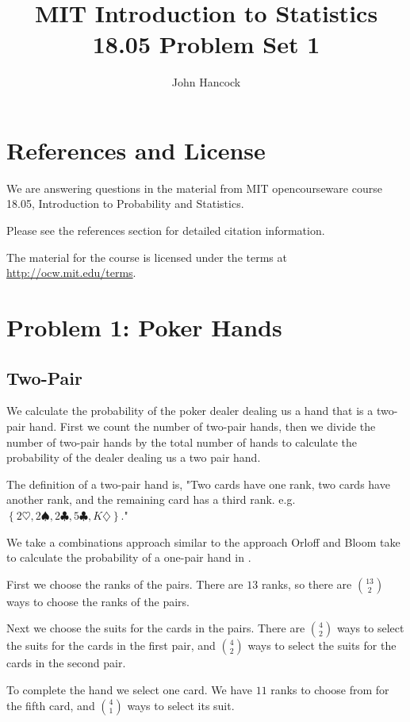 \documentclass[a4paper,11pt]{article}
\author{John Hancock}
\title{MIT Introduction to Statistics 18.05 Problem Set 1}
\begin{document}
\maketitle
\tableofcontents
\section{References and License}
We are answering questions in the material from MIT opencourseware
course 18.05, Introduction to Probability and Statistics.

Please see the references section for detailed citation information.

The material for the course is licensed under the terms at 
\url{http://ocw.mit.edu/terms}.

\section{Problem 1: Poker Hands}
\subsection{Two-Pair}
We calculate the probability of the poker dealer dealing us a 
hand that is a two-pair hand. First we count the number of two-pair
hands, then we divide the number of two-pair hands by the total
number of hands to calculate the probability of the dealer dealing us
a two pair hand.

The definition of a two-pair hand is, "Two cards have one rank, 
two cards have another rank, and the remaining card has a third rank.
e.g.$\left\{ 2\heartsuit, 2\spadesuit, 2\clubsuit, 5
\clubsuit, K\diamondsuit \right\}$." \cite{probSet1}

We take a combinations approach similar to the approach Orloff and
Bloom take to calculate the probability of a one-pair hand in
\cite{classSlides2}.

First we choose the ranks of the pairs.  There are $13$ ranks, so
there are $\binom{13}{2}$ ways to choose the ranks of the pairs.

Next we choose the suits for the cards in the pairs.  There are
$\binom{4}{2}$ ways to select the suits for the cards in the first
pair, and $\binom{4}{2}$ ways to select the suits for the cards in
the second pair.

To complete the hand we select one card.  We have $11$ ranks to choose
from for the fifth card, and $\binom{4}{1}$ ways to select its suit.
\end{document}
